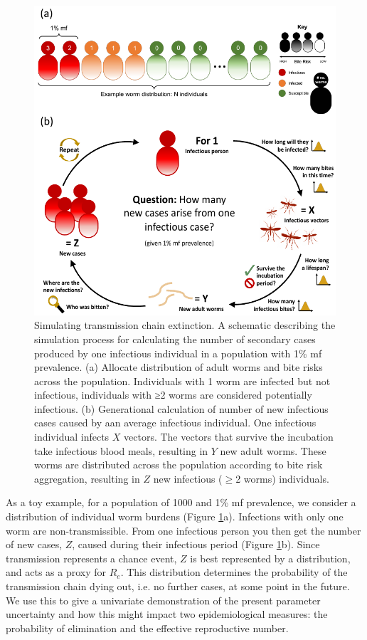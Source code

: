 \begin{figure}
    \centering
    \includegraphics{Project/Figures/LFElimination/Figure2.pdf}
    \caption{Simulating transmission chain extinction. A schematic describing the simulation process for calculating the number of secondary cases produced by one infectious individual in a population with 1\% mf prevalence. (a) Allocate distribution of adult worms and bite risks across the population. Individuals with 1 worm are infected but not infectious, individuals with ≥2 worms are considered potentially infectious. (b) Generational calculation of number of new infectious cases caused by aan average infectious individual. One infectious individual infects $X$ vectors. The vectors that survive the incubation take infectious blood meals, resulting in $Y$ new adult worms. These worms are distributed across the population according to bite risk aggregation, resulting in $Z$ new infectious ($\geq$2 worms) individuals.}
    \label{fig:Elim_2}
\end{figure}

As a toy example, for a population of 1000 and 1\% mf prevalence, we consider a distribution of individual worm burdens (Figure \ref{fig:Elim_2}a). Infections with only one worm are non-transmissible. From one infectious person you then get the number of new cases, $Z$, caused during their infectious period (Figure \ref{fig:Elim_2}b). Since transmission represents a chance event, $Z$ is best represented by a distribution, and acts as a proxy for $R_e$. This distribution determines the probability of the transmission chain dying out, i.e. no further cases, at some point in the future. We use this to give a univariate demonstration of the present parameter uncertainty and how this might impact two epidemiological measures: the probability of elimination and the effective reproductive number.

